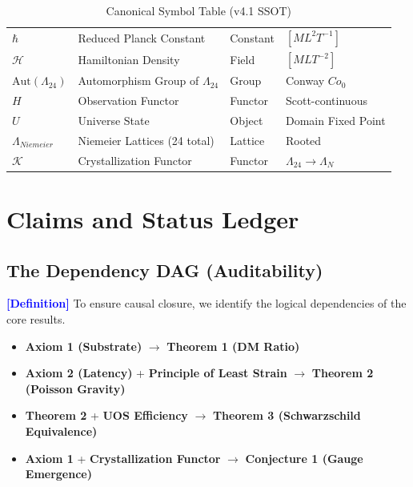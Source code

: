 \documentclass[11pt,titlepage]{article}
\newcommand{\leech}{\Lambda_{24}}
\newcommand{\tagdef}{\textcolor{blue}{\textbf{[Definition]}} }
\begin{document}
\begin{table}[h!]
\begin{tabular}{@{}llll@{}}
$\hbar$ & Reduced Planck Constant & Constant & $[M L^2 T^{-1}]$ \\
$\mathcal{H}$ & Hamiltonian Density & Field & $[M L T^{-2}]$ \\
$\text{Aut}(\leech)$ & Automorphism Group of $\leech$ & Group & Conway $Co_0$ \\
$H$ & Observation Functor & Functor & Scott-continuous \\
$U$ & Universe State & Object & Domain Fixed Point \\
$\Lambda_{Niemeier}$ & Niemeier Lattices (24 total) & Lattice & Rooted \\
$\mathcal{K}$ & Crystallization Functor & Functor & $\leech \to \Lambda_N$ \\ \bottomrule
\end{tabular}
\caption{Canonical Symbol Table (v4.1 SSOT)}
\end{table}

\newpage
\tableofcontents
\newpage

\section{Claims and Status Ledger}
\subsection{The Dependency DAG (Auditability)}
\tagdef To ensure causal closure, we identify the logical dependencies of the core results.
\begin{itemize}
    \item \textbf{Axiom 1 (Substrate)} $\to$ \textbf{Theorem 1 (DM Ratio)}
    \item \textbf{Axiom 2 (Latency)} + \textbf{Principle of Least Strain} $\to$ \textbf{Theorem 2 (Poisson Gravity)}
    \item \textbf{Theorem 2} + \textbf{UOS Efficiency} $\to$ \textbf{Theorem 3 (Schwarzschild Equivalence)}
    \item \textbf{Axiom 1} + \textbf{Crystallization Functor} $\to$ \textbf{Conjecture 1 (Gauge Emergence)}
\end{itemize}
\end{document}
